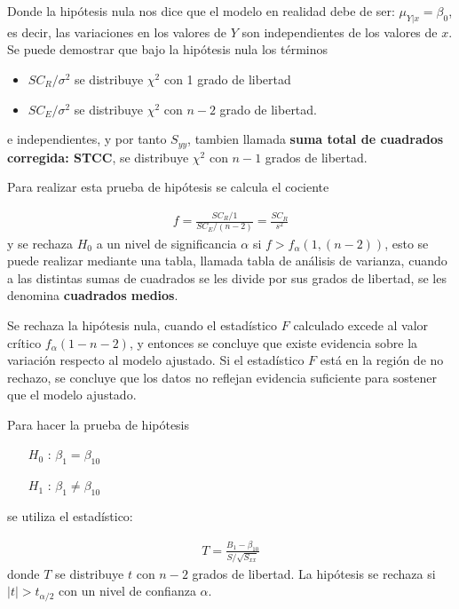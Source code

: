 \begin{itemize}
\begin{enumerate}
Donde la hip\'otesis nula nos dice que el modelo en realidad debe de ser: $\mu_{Y|x}=\beta_{0}$, es decir, las variaciones en los valores de $Y$ son independientes de los valores de $x$. Se puede demostrar que bajo la hip\'otesis nula los t\'erminos

\begin{itemize}
\item $SC_{R}/\sigma^{2}$ se distribuye $\chi^{2}$ con 1 grado de libertad
\item $SC_{E}/\sigma^{2}$ se distribuye $\chi^{2}$ con $n-2$ grado de libertad.
\end{itemize}
e independientes, y por tanto $S_{yy}$,  tambien llamada \textbf{suma total de cuadrados corregida: STCC}, se distribuye $\chi^{2}$ con $n-1$ grados de libertad.

Para realizar esta prueba de hip\'otesis se calcula el cociente

\begin{eqnarray*}
f=\frac{SC_{R}/1}{SC_{E}/\left(n-2\right)}=\frac{SC_{R}}{s^{2}}
\end{eqnarray*}
y se rechaza $H_{0}$ a un nivel de significancia $\alpha$ si $f>f_{\alpha}\left(1,\left(n-2\right)\right)$, esto se puede realizar mediante una tabla, llamada tabla de an\'alisis de varianza, cuando a las distintas sumas de cuadrados se les divide por sus grados de libertad, se les denomina \textbf{cuadrados medios}.

Se rechaza la hip\'otesis nula, cuando el estad\'istico $F$ calculado excede al valor cr\'itico $f_{\alpha}\left(1-n-2\right)$, y entonces se concluye que existe evidencia sobre la variaci\'on respecto al modelo ajustado. Si el estad\'istico $F$ est\'a en la regi\'on de no rechazo, se concluye que los datos no reflejan evidencia suficiente para sostener que el modelo ajustado.

Para hacer la prueba de hip\'otesis 
\begin{itemize}
\item[$H_{0}$ :]$\beta_{1}=\beta_{10}$
\item[$H_{1}$ :]$\beta_{1}\neq\beta_{10}$
\end{itemize}

se utiliza el estad\'istico:

\begin{eqnarray*}
T=\frac{B_{1}-\beta_{10}}{S/\sqrt{S_{xx}}}
\end{eqnarray*}
donde $T$ se distribuye $t$ con $n-2$ grados de libertad. La hip\'otesis se rechaza si $|t|>t_{\alpha/2}$ con un nivel de confianza $\alpha$.


\end{enumerate}
\end{itemize}
